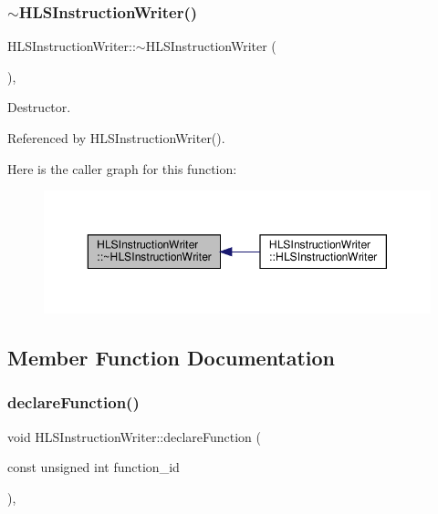 \subsubsection{\texorpdfstring{$\sim$\+H\+L\+S\+Instruction\+Writer()}{~HLSInstructionWriter()}}
{\footnotesize\ttfamily H\+L\+S\+Instruction\+Writer\+::$\sim$\+H\+L\+S\+Instruction\+Writer (\begin{DoxyParamCaption}{ }\end{DoxyParamCaption})\hspace{0.3cm}{\ttfamily [override]}, {\ttfamily [default]}}



Destructor. 



Referenced by H\+L\+S\+Instruction\+Writer().

Here is the caller graph for this function\+:
\nopagebreak
\begin{figure}[H]
\begin{center}
\leavevmode
\includegraphics[width=350pt]{d9/d89/classHLSInstructionWriter_ae60b4108cd5e97dcec2cb1505fa0b224_icgraph}
\end{center}
\end{figure}


\subsection{Member Function Documentation}
\mbox{\label{classHLSInstructionWriter_af6de1a6a4a37f62779bc688ad89a0a08}} 
\subsubsection{\texorpdfstring{declare\+Function()}{declareFunction()}}
{\footnotesize\ttfamily void H\+L\+S\+Instruction\+Writer\+::declare\+Function (\begin{DoxyParamCaption}\item[{const unsigned int}]{function\+\_\+id }\end{DoxyParamCaption})\hspace{0.3cm}{\ttfamily [override]}, {\ttfamily [virtual]}}



